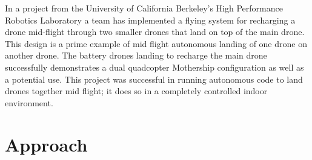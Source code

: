 \documentclass[11pt]{article}
\begin{document}
In a project from the University of California Berkeley's High Performance Robotics Laboratory a team has implemented a flying system for recharging a drone mid-flight through two smaller drones that land on top of the main drone. This design is a prime example of mid flight autonomous landing of one drone on another drone.  The battery drones landing to recharge the main drone successfully demonstrates a dual quadcopter Mothership configuration as well as a potential use. This project was successful in running autonomous code to land drones together mid flight; it does so in a completely controlled indoor environment.\cite{9197580}\\
\section{Approach}
\end{document}

